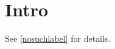 \documentclass{article}
\begin{document}
\section{Intro}\label{sec:intro}
See \ref{nosuchlabel} for details.
\end{document}
